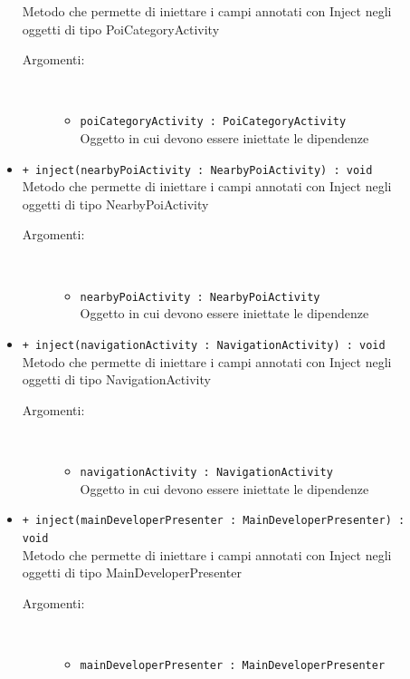 \documentclass[../DefinizioneDiProdotto.tex]{subfiles}
\begin{document}
\begin{description}
\begin{itemize}
		Metodo che permette di iniettare i campi annotati con Inject negli oggetti di tipo PoiCategoryActivity
		\begin{description}
			\item[Argomenti:] \
			\begin{itemize}
				\item \texttt{poiCategoryActivity : PoiCategoryActivity}\\
				Oggetto in cui devono essere iniettate le dipendenze\end{itemize}
		\end{description}
		\item \texttt{+ inject(nearbyPoiActivity : NearbyPoiActivity) : void}\\
		Metodo che permette di iniettare i campi annotati con Inject negli oggetti di tipo NearbyPoiActivity
		\begin{description}
			\item[Argomenti:] \
			\begin{itemize}
				\item \texttt{nearbyPoiActivity : NearbyPoiActivity}\\
				Oggetto in cui devono essere iniettate le dipendenze\end{itemize}
		\end{description}
		\item \texttt{+ inject(navigationActivity : NavigationActivity) : void}\\
		Metodo che permette di iniettare i campi annotati con Inject negli oggetti di tipo NavigationActivity
		\begin{description}
			\item[Argomenti:] \
			\begin{itemize}
				\item \texttt{navigationActivity : NavigationActivity}\\
				Oggetto in cui devono essere iniettate le dipendenze\end{itemize}
		\end{description}
		\item \texttt{+ inject(mainDeveloperPresenter : MainDeveloperPresenter) : void}\\
		Metodo che permette di iniettare i campi annotati con Inject negli oggetti di tipo MainDeveloperPresenter
		\begin{description}
			\item[Argomenti:] \
			\begin{itemize}
				\item \texttt{mainDeveloperPresenter : MainDeveloperPresenter}\\

\end{itemize}
\end{description}
\end{itemize}
\end{description}
\end{document}
